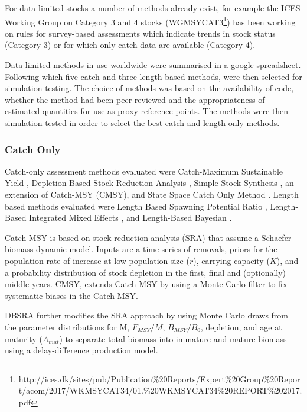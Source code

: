 For data limited stocks a number of methods already exist, for example the ICES Working Group on Category 3 and 4 stocks (WGMSYCAT3\footnote{http://ices.dk/sites/pub/Publication\%20Reports/Expert\%20Group\%20Report/acom/2017/WKMSYCAT34/01.\%20WKMSYCAT34\%20REPORT\%202017.pdf}) has been working on rules for survey-based assessments which indicate trends in stock status (Category 3) or for which only catch data are available (Category 4). 

Data limited methods in use worldwide were summarised in a \href{https://docs.google.com/spreadsheets/d/17_qQdzDY41ZrL0yT6QtHpUR4_ydxx_xfCh4GiDqYymU/edit?usp=sharing}{google spreadsheet}. Following which five catch and three length based methods, were then selected for simulation testing. The choice of methods was based on the availability of code, whether the method had been peer reviewed and the appropriateness of estimated quantities for use as proxy reference points. The methods were then simulation tested \citep{pons2019catchlen} in order to select the best catch and length-only methods.


\subsubsection*{Catch Only}

Catch-only assessment methods evaluated were Catch-Maximum Sustainable Yield \citep[Catch-MSY][]{martell2013simple}, Depletion Based  Stock Reduction Analysis \citep[DBSRA][]{dick2011depletion}, Simple Stock Synthesis \citep[SSS][]{cope2013implementing}, an extension of Catch-MSY (CMSY), and State Space Catch Only Method \citep[SSCOM][]{thorson2015catch}. Length based methods evaluated were Length Based Spawning Potential Ratio \citep[LBSPR][]{hordyk2014novel,hordyk2015evaluation}, Length-Based Integrated Mixed Effects \citep[LIME][]{rudd2017accounting}, and Length-Based Bayesian \citep[LBB][]{froese2018new}.

Catch-MSY  is based on stock reduction analysis (SRA) that assume a Schaefer biomass dynamic model. Inputs are a time series of removals, priors for the population rate of increase at low population size ($r$), carrying capacity ($K$), and a probability distribution of stock depletion in the first, final and (optionally) middle years. CMSY, extends Catch-MSY by using a Monte-Carlo filter to fix systematic biases in the Catch-MSY. 

DBSRA further modifies the SRA approach by using Monte Carlo draws from the parameter distributions for M, $F_{MSY}/M$, $B_{MSY}/B_0$, depletion, and age at maturity ($A_{mat}$) to separate total biomass into immature and mature biomass using a delay-difference production model. 

